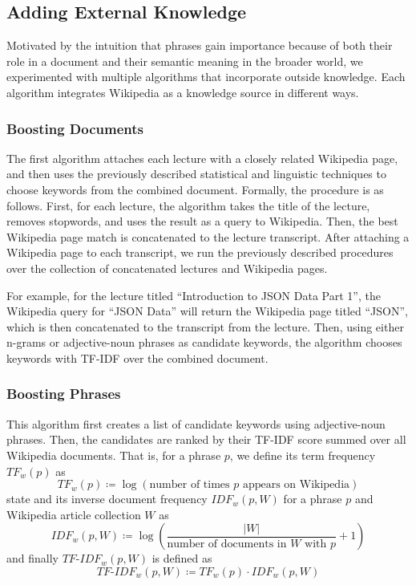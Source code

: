 \subsection{Adding External Knowledge}
\label{sec:wiki}


Motivated by the intuition that phrases gain importance because of both their role in a document and their semantic meaning in the broader world, we experimented with multiple algorithms that incorporate outside knowledge. Each algorithm integrates Wikipedia as a knowledge source in different ways.

\subsubsection{Boosting Documents}

The first algorithm attaches each lecture with a closely related Wikipedia page, and then uses the previously described statistical and linguistic techniques to choose keywords from the combined document. Formally, the procedure is as follows. First, for each lecture, the algorithm takes the title of the lecture, removes stopwords, and uses the result as a query to Wikipedia. Then, the best Wikipedia page match is concatenated to the lecture transcript. After attaching a Wikipedia page to each transcript, we run the previously described procedures over the collection of concatenated lectures and Wikipedia pages.

For example, for the lecture titled ``Introduction to JSON Data Part 1'', the Wikipedia query for ``JSON Data'' will return the Wikipedia page titled ``JSON'', which is then concatenated to the transcript from the lecture. Then, using either n-grams or adjective-noun phrases as candidate keywords, the algorithm chooses keywords with TF-IDF over the combined document.

\subsubsection{Boosting Phrases}

This algorithm first creates a list of candidate keywords using adjective-noun phrases. Then, the candidates are ranked by their TF-IDF score summed over all Wikipedia documents. That is, for a phrase $p$, we define its term frequency $TF_w(p)$ as
\begin{equation*}
TF_w(p) \coloneqq \log\left(\text{number of times } p \text{ appears on Wikipedia}\right)
\end{equation*}state
and its inverse document frequency $IDF_w(p, W)$ for a phrase $p$ and Wikipedia article collection $W$ as
\begin{equation*}
IDF_w(p, W) \coloneqq \log\left(\frac{|W|}{\text{number of documents in } W \text{ with } p} + 1\right)
\end{equation*}
and finally $TF\text{-}IDF_w(p, W)$ is defined as
\begin{equation*}
TF\text{-}IDF_w(p, W) \coloneqq TF_w(p) \cdot IDF_w(p, W)
\end{equation*}

